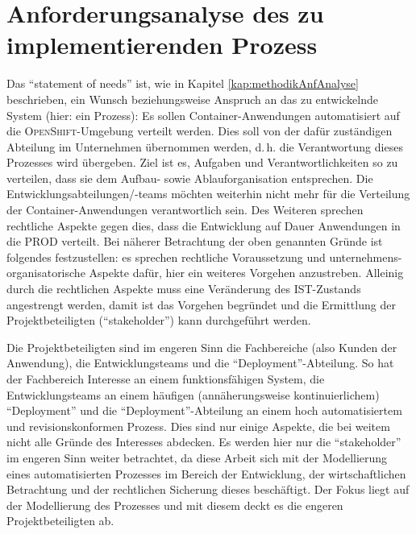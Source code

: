 \section{Anforderungsanalyse des zu implementierenden Prozess}
Das \enquote{statement of needs} ist, wie in Kapitel \vref{kap:methodikAnfAnalyse} beschrieben, ein Wunsch beziehungsweise Anspruch an das zu entwickelnde System (hier: ein Prozess): Es sollen Container-Anwendungen automatisiert auf die \textsc{OpenShift}-Umgebung verteilt werden. Dies soll von der dafür zuständigen Abteilung im Unternehmen übernommen werden, d.\,h. die Verantwortung dieses Prozesses wird übergeben. Ziel ist es, Aufgaben und Verantwortlichkeiten so zu verteilen, dass sie dem Aufbau- sowie Ablauforganisation entsprechen. Die Entwicklungsabteilungen/-teams möchten weiterhin nicht mehr für die Verteilung der Container-Anwendungen verantwortlich sein. Des Weiteren sprechen rechtliche Aspekte gegen dies, dass die Entwicklung auf Dauer Anwendungen in die \ac{PROD} verteilt. Bei näherer Betrachtung der oben genannten Gründe ist folgendes festzustellen: es sprechen rechtliche Voraussetzung und unternehmens-organisatorische Aspekte dafür, hier ein weiteres Vorgehen anzustreben. Alleinig durch die rechtlichen Aspekte muss eine Veränderung des IST-Zustands angestrengt werden, damit ist das Vorgehen begründet und die Ermittlung der Projektbeteiligten (\enquote{stakeholder}) kann durchgeführt werden.
\par
Die Projektbeteiligten sind im engeren Sinn die Fachbereiche (also Kunden der Anwendung), die Entwicklungsteams und die \enquote{Deployment}-Abteilung. So hat der Fachbereich Interesse an einem funktionsfähigen System, die Entwicklungsteams an einem häufigen (annäherungsweise kontinuierlichem) \enquote{Deployment} und die \enquote{Deployment}-Abteilung an einem hoch automatisiertem und revisionskonformen Prozess. Dies sind nur einige Aspekte, die bei weitem nicht alle Gründe des Interesses abdecken. Es werden hier nur die \enquote{stakeholder} im engeren Sinn weiter betrachtet, da diese Arbeit sich mit der Modellierung eines automatisierten Prozesses im Bereich der Entwicklung, der wirtschaftlichen Betrachtung und der rechtlichen Sicherung dieses beschäftigt. Der Fokus liegt auf der Modellierung des Prozesses und mit diesem deckt es die engeren Projektbeteiligten ab. 
\par
